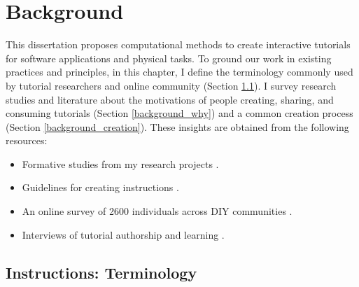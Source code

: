 
\chapter{Background}
\label{chapter_background}

This dissertation proposes computational methods to create interactive tutorials for software applications and physical tasks. To ground our work in existing practices and principles, in this chapter, I define the terminology commonly used by tutorial researchers and online community (Section \ref{background_terms}).
%
I survey research studies and literature about the motivations of people creating, sharing, and consuming tutorials (Section \ref{background_why}) and a common creation process (Section \ref{background_creation}).
%
These insights are obtained from the following resources:
\begin{itemize}
  \itemsep -2pt
  \item Formative studies from my research projects \cite{Chi:2012:MAG:2380116.2380130,Chi:2014:DRS:2556288.2557254,Chi:2013:DGC:2501988.2502052}.
  \item Guidelines for creating instructions \cite{InstructableHowTo,wikiHowHowTo}.
  \item An online survey of 2600 individuals across DIY communities \cite{Kuznetsov:2010:REA:1868914.1868950}.
  \item Interviews of tutorial authorship and learning \cite{Torrey:2007he,Torrey:2009fc,Wakkary:2015:TAH:2702123.2702550}.
\end{itemize}


\section{Instructions: Terminology}
\label{background_terms}

